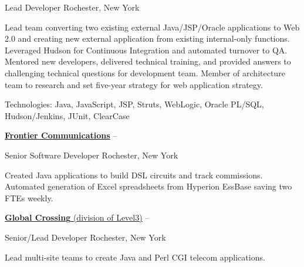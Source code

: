 \documentclass[letterpaper,MMMMyyyy,nonstopmode]{simpleresumecv}
\newcommand{\comment}[1]{\ignorespaces} %
\begin{document}
\begin{Body}
Lead Developer
\hfill
Rochester, New York

\begin{Detail}
\BulletItem
Lead team converting two existing external Java/JSP/Oracle applications to Web 2.0 and creating new external application from existing internal-only functions. Leveraged Hudson for Continuous Integration and automated turnover to QA.
\BulletItem
Mentored new developers, delivered technical training, and provided answers to challenging technical questions for development team.
\BulletItem
Member of architecture team to research and set five-year strategy for web application strategy.

\Gap
Technologies: Java, JavaScript, JSP, Struts, WebLogic, Oracle PL/SQL, Hudson/Jenkins, JUnit, ClearCase
\end{Detail}

\BigGap
\Entry
\href{http://www.frontier.com/}
{\textbf{Frontier Communications}}
\hfill 
 -- 

Senior Software Developer
\hfill
Rochester, New York

\begin{Detail}
\Item
Created Java applications to build DSL circuits and track commissions\comment{; CruiseControl used for Continuous Integration}. 
Automated generation of \comment{20} Excel spreadsheets from Hyperion EssBase saving two FTEs weekly.

\end{Detail}

\BigGap
\Entry
\href{http://www.globalcrossing.com/}
{\textbf{Global  Crossing} (division of Level3)}
\hfill 
 -- 

Senior/Lead Developer
\hfill
Rochester, New York

\begin{Detail}
\Item
Lead multi-site teams to create Java and Perl CGI telecom applications.

\end{Detail}


\end{Body}
\end{document}

